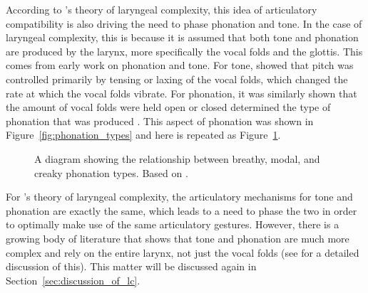According to \citeauthor{silvermanLaryngealComplexityOtomanguean1997}'s theory of laryngeal complexity, this idea of articulatory compatibility is also driving the need to phase phonation and tone. In the case of laryngeal complexity, this is because it is assumed that both tone and phonation are produced by the larynx, more specifically the vocal folds and the glottis. This comes from early work on phonation and tone. For tone, \citet{ohalaProductionTone1978} showed that pitch was controlled primarily by tensing or laxing of the vocal folds, which changed the rate at which the vocal folds vibrate. For phonation, it was similarly shown that the amount of vocal folds were held open or closed determined the type of phonation that was produced \citep{ladefogedSoundsWorldsLanguages1996}. This aspect of phonation was shown in Figure~\ref{fig:phonation_types} and here is repeated as Figure~\ref{fig:phonation_types_repeat}. 

\begin{figure}[h!]
    \centering
    \caption{A diagram showing the relationship between breathy, modal, and creaky phonation types. Based on \citet{gordonPhonationTypesCrosslinguistic2001}.}
    \label{fig:phonation_types_repeat}
\end{figure}

For \citeauthor{silvermanLaryngealComplexityOtomanguean1997}'s \citeyear{silvermanLaryngealComplexityOtomanguean1997} theory of laryngeal complexity, the articulatory mechanisms for tone and phonation are exactly the same, which leads to a need to phase the two in order to optimally make use of the same articulatory gestures. However, there is a growing body of literature that shows that tone and phonation are much more complex and rely on the entire larynx, not just the vocal folds (see \cite{eslingVoiceQualityLaryngeal2019} for a detailed discussion of this). This matter will be discussed again in Section~\ref{sec:discussion_of_lc}.

